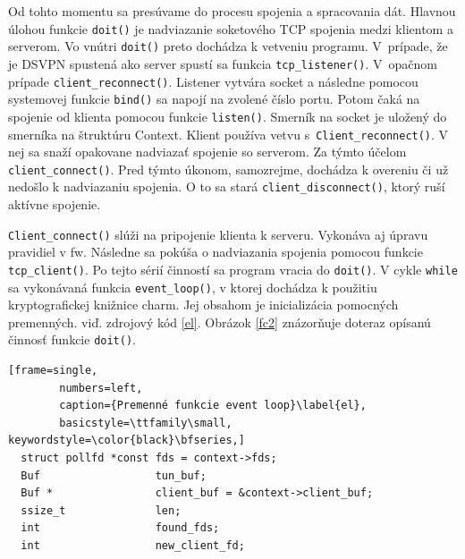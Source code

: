 Od tohto momentu sa presúvame do procesu spojenia a spracovania dát. Hlavnou úlohou funkcie \lstinline|doit()| je nadviazanie soketového TCP spojenia medzi klientom a serverom. Vo vnútri \lstinline|doit()| preto dochádza k vetveniu programu. V~prípade, že je DSVPN spustená ako server spustí sa funkcia \lstinline|tcp_listener()|. V~opačnom prípade \lstinline|client_reconnect()|. Listener vytvára socket a následne pomocou systemovej funkcie \lstinline|bind()| sa napojí na zvolené číslo portu. Potom čaká na spojenie od klienta pomocou funkcie \lstinline|listen()|. Smerník na socket je uložený do smerníka na štruktúru Context.
Klient používa vetvu s~\lstinline|Client_reconnect()|. V nej sa snaží opakovane nadviazať spojenie so serverom. Za týmto účelom \\\lstinline|client_connect()|. Pred týmto úkonom, samozrejme, dochádza k overeniu či už nedošlo k nadviazaniu spojenia. O to sa stará \lstinline|client_disconnect()|, ktorý ruší aktívne spojenie.

\lstinline|Client_connect()| slúži na pripojenie klienta k serveru. Vykonáva aj úpravu pravidiel v \acrshort{fw}. Následne sa pokúša o nadviazania spojenia pomocou funkcie  \lstinline|tcp_client()|. Po tejto sérií činností sa program vracia do \lstinline|doit()|. V cykle \lstinline|while| sa vykonávaná funkcia \lstinline|event_loop()|, v ktorej dochádza k použitiu kryptografickej knižnice charm. Jej obsahom je inicializácia pomocných premenných. viď. zdrojový kód \ref{el}. Obrázok \ref{fc2} znázorňuje doteraz opísanú činnosť funkcie \lstinline|doit()|.
  
  \begin{minipage}{\linewidth} 	
  	\begin{lstlisting}[frame=single,
  		numbers=left,
  		caption={Premenné funkcie event loop}\label{el},
  		basicstyle=\ttfamily\small, keywordstyle=\color{black}\bfseries,]
  struct pollfd *const fds = context->fds;
  Buf                  tun_buf;
  Buf *                client_buf = &context->client_buf;
  ssize_t              len;
  int                  found_fds;
  int                  new_client_fd;
    	\end{lstlisting}
\end{minipage}\\ 
 
 

